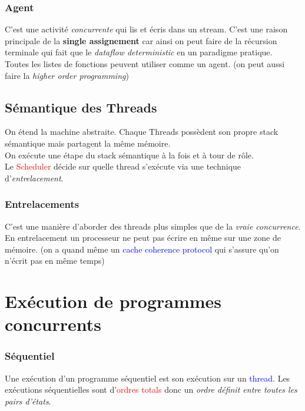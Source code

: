 \documentclass{report}
\begin{document}
\subsubsection{Agent}
C'est une activité \textit{concurrente} qui lis et écris dans un stream. C'est une raison principale de la \textbf{single assignement} car ainsi on peut faire de la récursion terminale qui fait que le \textit{dataflow deterministic} en un paradigme pratique.\\
Toutes les listes de fonctions peuvent utiliser comme un agent. (on peut aussi faire la \textit{higher order programming})

\subsection{Sémantique des Threads}
On étend la machine abstraite. Chaque Threads possèdent son propre stack sémantique mais partagent la même mémoire.\\
On exécute une étape du stack sémantique à la fois et à tour de rôle.\\
Le \textcolor{red}{Scheduler} décide sur quelle thread s'exécute via une technique d'\textit{entrelacement}.

\subsubsection{Entrelacements}
C'est une manière d'aborder des threads plus simples que de la \textit{vraie concurrence}. En entrelacement un processeur ne peut pas écrire en même sur une zone de mémoire. (on a quand même un \textcolor{blue}{cache coherence protocol} qui s'assure qu'on n'écrit pas en même temps)

\section{Exécution de programmes concurrents}

\subsubsection{Séquentiel}
Une exécution d'un programme séquentiel est son exécution sur un \textcolor{blue}{thread}. Les exécutions séquentielles sont d'\textcolor{red}{ordres totals} donc un \textit{ordre définit entre toutes les pairs d'états}.
\end{document}
